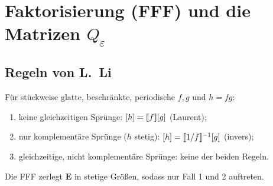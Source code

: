 \section{Faktorisierung (FFF) und die Matrizen $Q_\varepsilon$}\label{sec:fff}

\subsection{Regeln von L.~Li}
Für stückweise glatte, beschränkte, periodische $f,g$ und $h=fg$:
\begin{enumerate}[nosep]
  \item keine gleichzeitigen Sprünge: $[h]=[\![f]\!][g]$ (Laurent);
  \item nur komplementäre Sprünge ($h$ stetig): $[h]=[\![1/f]\!]^{-1}[g]$ (invers);
  \item gleichzeitige, nicht komplementäre Sprünge: keine der beiden Regeln.
\end{enumerate}
Die FFF zerlegt $\mathbf E$ in stetige Größen, sodass nur Fall 1 und 2 auftreten.

